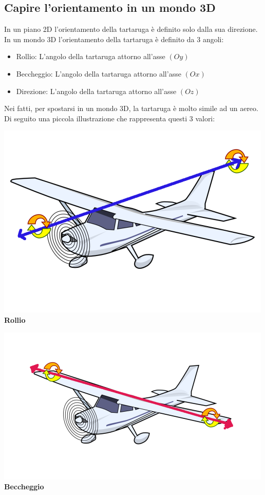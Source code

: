 \subsection{Capire l'orientamento in un mondo 3D}
In un piano 2D l'orientamento della tartaruga è definito solo dalla sua direzione. In un mondo 3D l'orientamento della tartaruga è definito da 3 angoli:
\begin{itemize}
	\item Rollio: L'angolo della tartaruga attorno all'asse $(Oy)$
	\item Beccheggio: L'angolo della tartaruga attorno all'asse $(Ox)$
	\item Direzione: L'angolo della tartaruga attorno all'asse $(Oz)$ 
\end{itemize}
Nei fatti, per spostarsi in un mondo 3D, la tartaruga è molto simile ad un aereo. Di seguito una piccola illustrazione che rappresenta questi 3 valori:\\
\begin{minipage}{5.8cm}
	\begin{center}
		\includegraphics*[scale=0.3]{pics/plane-roll.png}
		\textbf{Rollio}
	\end{center}
\end{minipage}
\begin{minipage}{5.5cm}
	\begin{center}
		\includegraphics*[scale=0.35]{pics/plane-pitch.png}
		\textbf{Beccheggio}
	\end{center}
\end{minipage}
